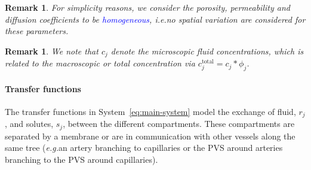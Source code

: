 \documentclass[10pt]{article}
\newcommand{\ie}{\emph{i.e.}\;}
\newcommand{\eg}{\emph{e.g.}\;}
\newcommand{\1}{^{(1)}}
\newcommand{\2}{^{(2)}}
\newtheorem{remark}[theorem]{Remark}
\newcommand{\corr}[1]{\textcolor{blue}{#1}}
\begin{document}
\begin{remark}
    For simplicity reasons, we consider the porosity, permeability and diffusion coefficients to be \corr{homogeneous}, \ie no spatial variation are considered for these parameters. 
\end{remark}

\begin{remark}
    We note that $c_j$ denote the microscopic fluid concentrations, which is related to the macroscopic or total concentration via $c_j^\text{total} = c_j*\phi_j$.
\end{remark}

\paragraph{Transfer functions}
The transfer functions in System~\eqref{eq:main-system} model the exchange of fluid, $r_j$, and solutes, $s_j$, between the different compartments. 
These compartments are separated by a membrane or are in communication with other vessels along the same tree (\eg an artery branching to capillaries or the PVS around arteries branching to the PVS around capillaries).
\end{document}
